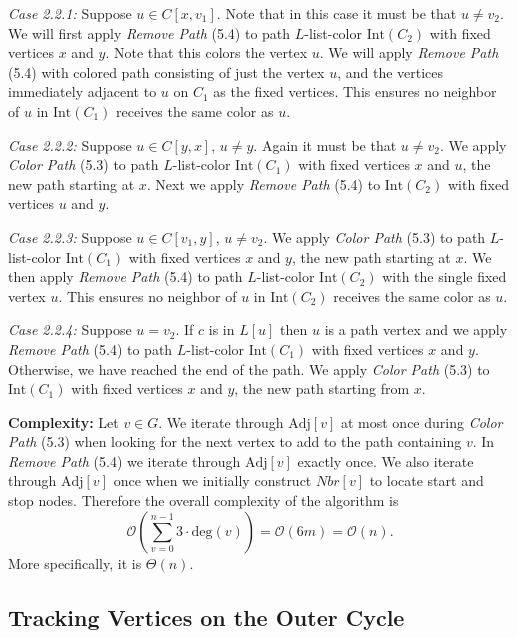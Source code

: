 \documentclass[letterpaper, 12pt]{article}
\theoremstyle{thm}
\begin{document}
\textit{Case 2.2.1:} Suppose $u\in C[x,v_1]$. Note that in this case it must be that
$u\ne v_2$. We will first apply \textit{Remove Path} (5.4) to path $L$-list-color
$\text{Int}(C_2)$ with fixed vertices $x$ and $y$. Note that this colors the vertex
$u$. We will apply \textit{Remove Path} (5.4) with colored path consisting of
just the vertex $u$, and the vertices immediately adjacent to $u$ on $C_1$ as
the fixed vertices. This ensures no neighbor of $u$ in
$\text{Int}(C_1)$ receives the same color as $u$. 

\textit{Case 2.2.2:} Suppose $u\in C[y,x]$, $u\ne y$. Again it must be that
$u\ne v_2$. We apply \textit{Color Path} (5.3) to path $L$-list-color
$\text{Int}(C_1)$ with fixed vertices $x$ and $u$, the new path starting at $x$.
Next we apply \textit{Remove Path} (5.4) to $\text{Int}(C_2)$ with fixed
vertices $u$ and $y$.

\textit{Case 2.2.3:} Suppose $u\in C[v_1,y]$, $u\ne v_2$. We apply
\textit{Color Path} (5.3) to path $L$-list-color $\text{Int}(C_1)$ with fixed
vertices $x$ and $y$, the new path starting at $x$. We then apply \textit{Remove
Path} (5.4) to path $L$-list-color $\text{Int}(C_2)$ with the single fixed 
vertex $u$. This ensures no neighbor of $u$ in
$\text{Int}(C_2)$ receives the same color as $u$.

\textit{Case 2.2.4:} Suppose $u= v_2$. If $c$ is in $L[u]$ then $u$ is a path vertex
and we apply \textit{Remove Path} (5.4) to path $L$-list-color $\text{Int}(C_1)$
with fixed vertices $x$ and $y$. Otherwise, we have reached the end of the path.
We apply \textit{Color Path} (5.3) to $\text{Int}(C_1)$ with fixed vertices $x$
and $y$, the new path starting from $x$.

\noindent\textbf{Complexity:} Let $v\in G$. We iterate through $\text{Adj}[v]$
at most once during \textit{Color Path} (5.3) when looking for the next vertex
to add to the path containing $v$. In \textit{Remove Path} (5.4) we iterate through
$\text{Adj}[v]$ exactly once. We also iterate through $\text{Adj}[v]$ once
when we initially construct $\textit{Nbr}[v]$ to locate start and stop nodes.
Therefore the overall complexity of the algorithm is
\[
    \mathcal{O}\left(\sum_{v=0}^{n-1}3\cdot\text{deg}(v)\right)
        =\mathcal{O}(6m)=\mathcal{O}(n).
\]
More specifically, it is $\Theta(n)$.

\subsection{Tracking Vertices on the Outer Cycle}
\end{document}
